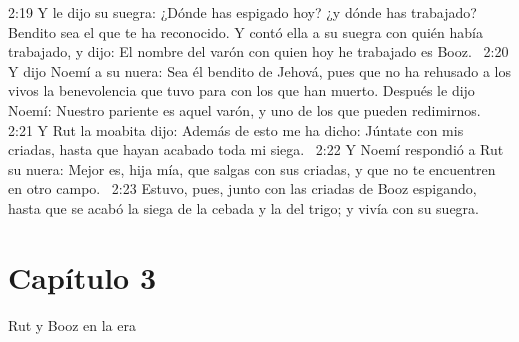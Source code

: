 2:19 Y le dijo su suegra: ¿Dónde has espigado hoy? ¿y dónde has trabajado? Bendito sea el que te ha reconocido. Y contó ella a su suegra con quién había trabajado, y dijo: El nombre del varón con quien hoy he trabajado es Booz.  
2:20 Y dijo Noemí a su nuera: Sea él bendito de Jehová, pues que no ha rehusado a los vivos la benevolencia que tuvo para con los que han muerto. Después le dijo Noemí: Nuestro pariente es aquel varón, y uno de los que pueden redimirnos.  
2:21 Y Rut la moabita dijo: Además de esto me ha dicho: Júntate con mis criadas, hasta que hayan acabado toda mi siega.  
2:22 Y Noemí respondió a Rut su nuera: Mejor es, hija mía, que salgas con sus criadas, y que no te encuentren en otro campo.  
2:23 Estuvo, pues, junto con las criadas de Booz espigando, hasta que se acabó la siega de la cebada y la del trigo; y vivía con su suegra.  
\section*{Capítulo 3}
Rut y Booz en la era  

